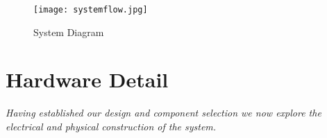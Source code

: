 \documentclass[comsoc, 12pt]{IEEEtran}
\begin{document}
\begin{figure}[h!]
\texttt{[image: systemflow.jpg]}
\centering
\caption{System Diagram}
 \label{fig:systemflow}
\end{figure}



\section{Hardware Detail}
\begin{center}
    \textit{Having established our design and component selection we now explore the electrical and physical construction of the system.}
\end{center}
\end{document}
